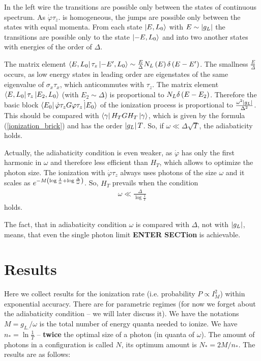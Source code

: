 In the left wire the transitions are possible only between the states of continuous spectrum. As $ \dot{\varphi}\tau_z. $ is homogeneous, the jumps are possible only between the states with equal momenta. From each state $ \ket{E,L_0} $ with $ E\sim\left|g_L\right| $ the transitions are possible only to the state $ \ket{-E,L_0} $ and into two another states with energies of the order of $ \Delta $.

  The matrix element $ \bra{E,L_0}\tau_z\ket{-E', L_0} \sim\frac{E}{\Delta}
  N_L\left(E\right)\delta\left(E-E'\right)$. The smallness $ \frac{E}{\Delta} $ occurs, as low energy states in leading order are eigenstates  of the same eigenvalue of $ \sigma_x\tau_x $, which anticommutes with $ \tau_z $. The matrix element $ \bra{E,L_0}\tau_z\ket{E_2, L_0}$ (with $ E_2\sim \Delta $) is proportional to $ N_L \delta\left(E-E_2\right) $. Therefore the basic block $ \bra{E_0}\dot{\varphi}\tau_zG\dot{\varphi\tau_z\ket{E_0}}$ of the ionization process is proportional to $ \frac{\omega^2\left|g_L\right|}{\Delta^2} $. This should be compared with $ \bra{\gamma}H_T G H_T \ket{\gamma}$, which is given by the formula (\ref{ionization_brick}) and has the order $ \left|g_L\right|T $. So, if $ \omega\ll\Delta\sqrt{T} $, the adiabaticity holds.
  
  Actually, the adiabaticity condition is even weaker, as $ \dot{\varphi} $ has only the first harmonic in $ \omega $  and therefore less efficient than $ H_T $, which allows to optimize the photon size. The ionization with $ \dot{\varphi}\tau_z $ always uses photons of the size $ \omega $ and it scales as $ e^{-M\left(\log\frac{1}{\alpha}+\log\frac{\Delta}{\omega}\right)} $. So, $ H_T $ prevails when the condition
  \begin{gather}
  \omega
  	\ll \frac{\Delta}{\log\frac{1}{T}}
  \end{gather}
  holds.
  
  The fact, that in adiabaticity condition  $\omega  $ is compared with $ \Delta $, not with $ \left|g_L\right| $, means, that even the single photon limit \textbf{ENTER SECTion} is achievable. 
\section{Results}

Here we collect results for the ionization rate (i.e. probability
$P\propto I_{M}^{2}$) within exponential accuracy. There are for
parametric regimes (for now we forget about the adiabaticity condition
-- we will later discuss it). We have the notations $M=g_{L.}/\omega$
is the total number of energy quanta needed to ionize. We have $n_{*}=\ln\frac{1}{T}$
-- \textbf{twice} the optimal size of a photon (in quanta of $\omega$).
The amount of photons in a configuration is called $N$, its optimum
amount is $N_{*}=2M/n_{*}$. The results are as follows:

